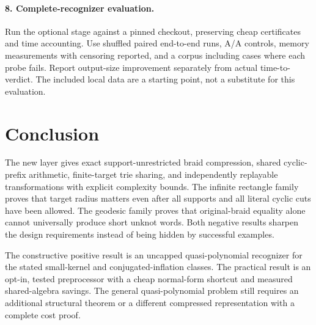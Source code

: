 \documentclass[11pt,a4paper]{article}
\theoremstyle{definition}\newtheorem{definition}[theorem]{Definition}
\theoremstyle{remark}\newtheorem{remark}[theorem]{Remark}
\begin{document}
\paragraph{8. Complete-recognizer evaluation.}
Run the optional stage against a pinned checkout, preserving cheap
certificates and time accounting. Use shuffled paired end-to-end runs,
A/A controls, memory measurements with censoring reported, and a corpus
including cases where each probe fails. Report output-size improvement
separately from actual time-to-verdict. The included local data are a
starting point, not a substitute for this evaluation.

\section{Conclusion}
The new layer gives exact support-unrestricted braid compression, shared
cyclic-prefix arithmetic, finite-target trie sharing, and independently
replayable transformations with explicit complexity bounds. The infinite
rectangle family proves that target radius matters even after all supports
and all literal cyclic cuts have been allowed. The geodesic family proves
that original-braid equality alone cannot universally produce short unknot
words. Both negative results sharpen the design requirements instead of
being hidden by successful examples.

The constructive positive result is an uncapped quasi-polynomial
recognizer for the stated small-kernel and conjugated-inflation classes.
The practical result is an opt-in, tested preprocessor with a cheap
normal-form shortcut and measured shared-algebra savings. The general
quasi-polynomial problem still requires an additional structural theorem
or a different compressed representation with a complete cost proof.

\appendix
\end{document}

